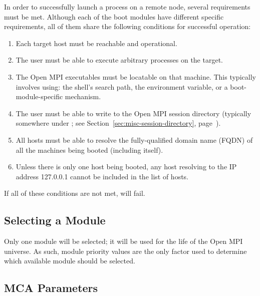 In order to successfully launch a process on a remote node, several
requirements must be met.  Although each of the boot modules have
different specific requirements, all of them share the following
conditions for successful operation:

\begin{enumerate}
\item Each target host must be reachable and operational.
  
\item The user must be able to execute arbitrary processes on the
  target.
  
\item The Open MPI executables must be locatable on that machine.  This
  typically involves using: the shell's search path, the
   environment variable, or a boot-module-specific
  mechanism.

\item The user must be able to write to the Open MPI session directory
  (typically somewhere under ; see
  Section~\ref{sec:misc-session-directory},
  page~\pageref{sec:misc-session-directory}).
  
\item All hosts must be able to resolve the fully-qualified domain
  name (FQDN) of all the machines being booted (including itself).
  
\item Unless there is only one host being booted, any host
  resolving to the IP address 127.0.0.1 cannot be included in the list
  of hosts.
\end{enumerate}

If all of these conditions are not met,  will fail.


\subsection{Selecting a  Module}

Only one  module will be selected; it will be used for the
life of the Open MPI universe.  As such, module priority values are the
only factor used to determine which available module should be
selected.


\subsection{ MCA Parameters}

